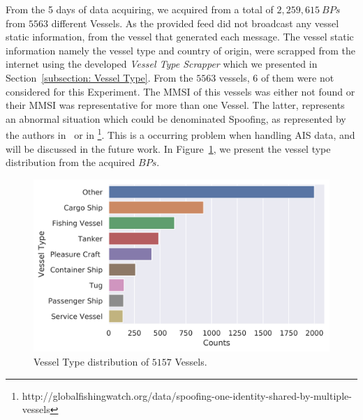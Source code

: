 From the 5 days of data acquiring, we acquired from a total of $2,259,615~BPs$ from $5563$ different Vessels.
As the provided feed did not broadcast any vessel static information, from the vessel that generated each message. The vessel static information namely the vessel type and country of origin, were scrapped from the internet using the developed \emph{Vessel Type Scrapper} which we presented in Section~\ref{subsection: Vessel Type}. 
From the $5563$ vessels, $6$ of them were not considered for this Experiment. The MMSI of this vessels was either not found or their MMSI was representative for more than one Vessel. The latter, represents an abnormal situation which could be denominated Spoofing, as represented by the authors in~\cite{Ray2015DeAISRisks} or in \footnote{http://globalfishingwatch.org/data/spoofing-one-identity-shared-by-multiple-vessels}. This is a occurring problem when handling AIS data, and will be discussed in the future work.
In Figure~\ref{fig: 5 Vessel Type Distribution}, we present the vessel type distribution from the acquired $BPs$.
\begin{figure}[H]
	\centering
	\includegraphics[scale = .7]{figures/Ch5/DataValidationVesselType.png}
    \caption{Vessel Type distribution of $5157$ Vessels.}
    \label{fig: 5 Vessel Type Distribution}
\end{figure}


